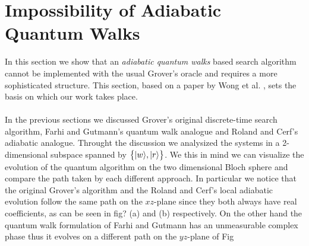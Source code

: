 \section{Impossibility of Adiabatic Quantum Walks}
In this section we show that an \textit{adiabatic quantum walks} based search algorithm cannot be implemented with the usual Grover's oracle and requires a more sophisticated structure. This section, based on a paper by Wong et al. \cite{Wong2016}, sets the basis on which our work takes place. \\ \\
In the previous sections we discussed Grover's original discrete-time search algorithm, Farhi and Gutmann's quantum walk analogue and Roland and Cerf's adiabatic analogue. Throught the discussion we analysized the systems in a 2-dimensional subspace spanned by $\big\{{|{w}\rangle}, {|{r}\rangle}\big\}$. We this in mind we can visualize the evolution of the quantum algorithm on the two dimensional Bloch sphere and compare the path taken by each different approach. In particular we notice that the original Grover's algorithm and the Roland and Cerf's local adiabatic evolution follow the same path on the $xz$-plane since they both always have real coefficients, as can be seen in fig? (a) and (b) respectively. On the other hand the quantum walk formulation of Farhi and Gutmann has an unmeasurable complex phase thus it evolves on a different path on the $yz$-plane of Fig

